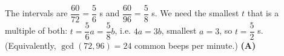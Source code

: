 The intervals are $\dfrac{60}{72}=\dfrac56$ s and $\dfrac{60}{96}=\dfrac58$ s. We need the smallest $t$ that is a multiple of both: $t=\dfrac56a=\dfrac58b$, i.e. $4a=3b$, smallest $a=3$, so $t=\dfrac52$ s. (Equivalently, $\gcd(72,96)=24$ common beeps per minute.) \textbf{(A)}
